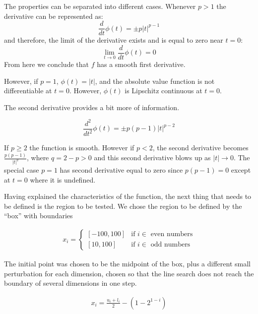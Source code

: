 The properties can be separated into different cases. Whenever $p > 1$ the derivative can be represented as:
\begin{equation}\label{firstderiv}
  \frac{d}{dt} \phi(t) = \pm p |t|^{p-1}
\end{equation}
and therefore, the limit of the derivative exists and is equal to zero near $t = 0$: \[ \lim_{t \to 0} \frac{d}{dt}\phi(t) = 0 \] From here we conclude that $f$ has a smooth first derivative.

However, if $p = 1$, $\phi(t) = |t|$, and the absolute value function is not differentiable at $t = 0$. However, $\phi(t)$ is Lipschitz continuous at $t = 0$.

The second derivative provides a bit more of information.

\begin{equation}\label{secondderiv}
  \frac{d^2}{dt^2} \phi(t) = \pm p(p-1) |t|^{p-2}
\end{equation}

If $p \geq 2$ the function is smooth. However if $p < 2$, the second derivative becomes $\frac{p(p-1)}{|t|^{q}}$, where $q = 2 - p > 0$ and this second derivative blows up as $|t| \to 0$. The special case $p = 1$ has second derivative equal to zero since $p(p-1) = 0$ except at $t = 0$ where it is undefined.

Having explained the characteristics of the function, the next thing that needs to be defined is the region to be tested. We chose the region to be defined by the ``box'' with boundaries

\begin{equation}
  \begin{aligned}
    x_i = 
    \begin{cases}
      [-100, 100] & \text{if } i \in \text{ even numbers} \\
      [10, 100] & \text{if } i \in \text{ odd numbers}
    \end{cases}
  \end{aligned}
\end{equation}

The initial point was chosen to be the midpoint of the box, plus a different small perturbation for each dimension, chosen so that the line search does not reach the boundary of several dimensions in one step.

\begin{equation}
  \begin{aligned}
    x_i = \frac{u_i + l_i}{2} - \left(1 - 2^{1 - i}\right)
  \end{aligned}
\end{equation}

